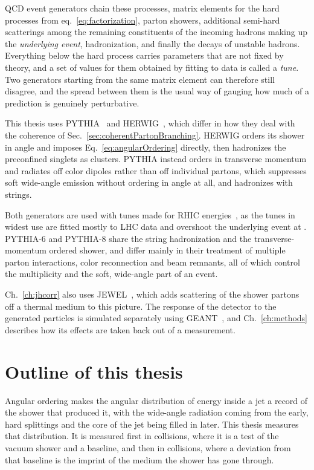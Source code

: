 QCD event generators chain these processes, matrix elements for the hard processes from eq.~\ref{eq:factorization}, parton showers, additional semi-hard scatterings among the remaining constituents of the incoming hadrons making up the \emph{underlying event}, hadronization, and finally the decays of unstable hadrons.
%
Everything below the hard process carries parameters that are not fixed by theory, and a set of values for them obtained by fitting to data is called a \emph{tune}.
%
Two generators starting from the same matrix element can therefore still disagree, and the spread between them is the usual way of gauging how much of a prediction is genuinely perturbative. 

This thesis uses PYTHIA~\cite{Sj_strand_2006} and HERWIG~\cite{Bellm:2015jjp}, which differ in how they deal with the coherence of Sec.~\ref{sec:coherentPartonBranching}.
%
HERWIG orders its shower in angle and imposes Eq.~\ref{eq:angularOrdering} directly, then hadronizes the preconfined singlets as clusters.
%
PYTHIA instead orders in transverse momentum and radiates off color dipoles rather than off individual partons, which suppresses soft wide-angle emission without ordering in angle at all, and hadronizes with strings.
%

Both generators are used with tunes made for RHIC energies~\cite{Skands_2010, PhysRevD.105.016011, adkins2019studying}, as the tunes in widest use are fitted mostly to LHC data and overshoot the underlying event at .
%
PYTHIA-6 and PYTHIA-8 share the string hadronization and the transverse-momentum ordered shower, and differ mainly in their treatment of multiple parton interactions, color reconnection and beam remnants, all of which control the multiplicity and the soft, wide-angle part of an event.
%

Ch.~\ref{ch:jhcorr} also uses JEWEL~\cite{Zapp:2013vla}, which adds scattering of the shower partons off a thermal medium to this picture.
%
The response of the detector to the generated particles is simulated separately using GEANT~\cite{Brun:1987ma}, and Ch.~\ref{ch:methods} describes how its effects are taken back out of a measurement.


\section{Outline of this thesis}
Angular ordering makes the angular distribution of energy inside a jet a record of the shower that produced it, with the wide-angle radiation coming from the early, hard splittings and the core of the jet being filled in later.
%
This thesis measures that distribution.
%
It is measured first in \pp collisions, where it is a test of the vacuum shower and a baseline, and then in \AuAu collisions, where a deviation from that baseline is the imprint of the medium the shower has gone through. 

